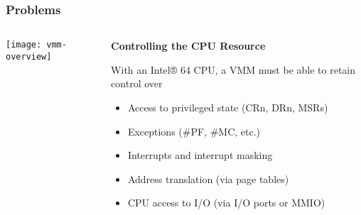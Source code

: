 \begin{frame}[plain]
	\frametitle{Problems}
	
	
	
	\begin{columns}
		
		\begin{column}{.3\textwidth}
			
			\texttt{[image: vmm-overview]}
			
		\end{column}
		
		\begin{column}{.7\textwidth}
			
			\textbf{Controlling the CPU Resource}
			
			With an Intel® 64 CPU, a VMM must be able to retain control over
			\begin{itemize}
				\item Access to privileged state (CRn, DRn, MSRs)
				\item Exceptions (\#PF, \#MC, etc.)
				\item Interrupts and interrupt masking
				\item Address translation (via page tables)
				\item CPU access to I/O (via I/O ports or MMIO)
			\end{itemize} 

		\end{column}
		
		
	\end{columns}
	
	
\end{frame}

